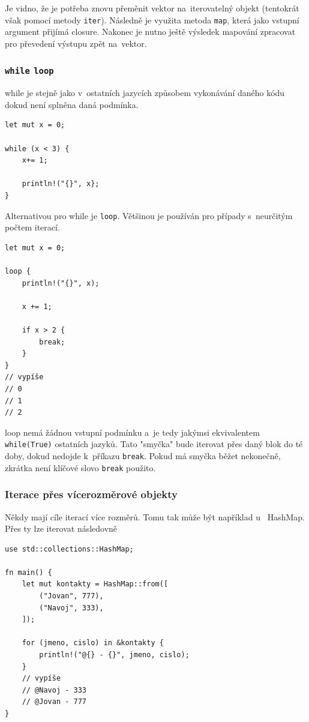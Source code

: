 \documentclass[a4paper, 12pt]{article} %
\newcommand{\rust}[1]{\texttt{#1}}
\begin{document}
			Je vidno, že je potřeba znovu přeměnit vektor na~iterovatelný objekt (tentokrát však pomocí metody \rust{iter}\cite{iter_into_iter}). Následně je využita metoda \rust{map}, která jako vstupní argument přijímá closure. Nakonec je nutno ještě výsledek mapování zpracovat pro převedení výstupu zpět na~vektor.


		\subsubsection*{\rust{while} \rust{loop}}
			while je stejně jako v~ostatních jazycích způsobem vykonávání daného kódu dokud není splněna daná podmínka.
			\begin{verbatim}
let mut x = 0;

while (x < 3) {
	x+= 1;
	
	println!("{}", x};
}
			\end{verbatim}
			
			Alternativou pro while je \rust{loop}. Většinou je používán pro případy s~neurčitým počtem iterací.
			\begin{verbatim}
let mut x = 0;

loop {
	println!("{}", x);
	
	x += 1;
	
	if x > 2 {
		break;
	}
}
// vypíše
// 0
// 1
// 2
			\end{verbatim}
			
			loop nemá žádnou vstupní podmínku a~je tedy jakýmsi ekvivalentem \linebreak\rust{while(True)} ostatních jazyků. Tato "smyčka" bude iterovat přes daný blok do té doby, dokud nedojde k~příkazu \texttt{break}. Pokud má smyčka běžet nekonečně, zkrátka není klíčové slovo \texttt{break} použito.


		\subsubsection*{Iterace přes vícerozměrové objekty}
			Někdy mají cíle iterací více rozměrů. Tomu tak může být například u~ HashMap. Přes ty lze iterovat následovně
			\begin{verbatim}
use std::collections::HashMap;

fn main() {
	let mut kontakty = HashMap::from([
		("Jovan", 777),
		("Navoj", 333),
	]);
	
	for (jmeno, cislo) in &kontakty {
		println!("@{} - {}", jmeno, cislo);
	}
	// vypíše
	// @Navoj - 333
	// @Jovan - 777
}
			\end{verbatim}
	
\end{document}
